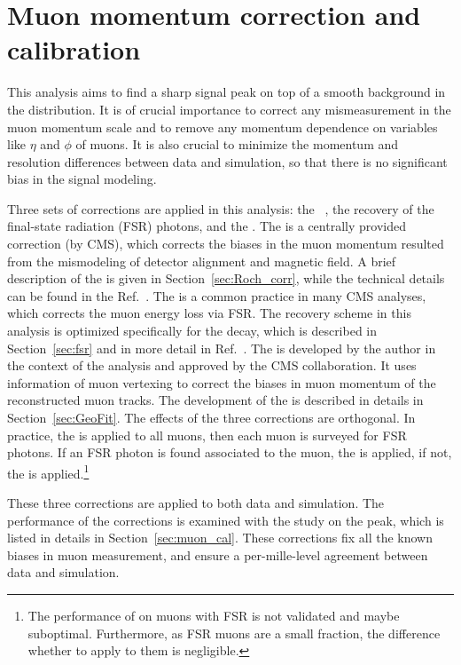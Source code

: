 \chapter{Muon momentum correction and calibration} \label{chp:muon_corr}

This analysis aims to find a sharp signal peak on top of a smooth background in the \mmm distribution.
It is of crucial importance to correct any mismeasurement in the muon momentum scale 
and to remove any momentum dependence on variables like $\eta$ and $\phi$ of muons.
It is also crucial to minimize the momentum and resolution differences between data and simulation, 
so that there is no significant bias in the signal modeling.

Three sets of corrections are applied in this analysis: 
the \RochCorr~\cite{Bodek:2012id}, the recovery of the final-state radiation (FSR) photons, and the \GeoFit.
The \RochCorr is a centrally provided correction (by CMS), which corrects 
the biases in the muon momentum resulted from the mismodeling of detector alignment and magnetic field. 
A brief description of the \RochCorr is given in Section~\ref{sec:Roch_corr}, 
while the technical details can be found in the Ref.~\cite{Bodek:2012id}.
The \FSR is a common practice in many CMS analyses, which corrects the muon energy loss via FSR.
The recovery scheme in this analysis is optimized specifically for the \hmm decay, which is described in Section~\ref{sec:fsr} and in more detail in Ref.~\cite{oliverthesis}.
The \GeoFit is developed by the author in the context of the \hmm analysis and approved by the CMS collaboration.
It uses information of muon vertexing to correct the biases in muon momentum of the reconstructed muon tracks.
The development of the \GeoFit is described in details in Section~\ref{sec:GeoFit}.
The effects of the three corrections are orthogonal.
In practice, the \RochCorr is applied to all muons, then each muon is surveyed for FSR photons.
If an FSR photon is found associated to the muon, the \FSR is applied, 
if not, the \GeoFit is applied.\footnote{The performance of \GeoFit on muons with FSR is not validated and maybe suboptimal. 
Furthermore, as FSR muons are a small fraction, the difference whether to apply \GeoFit to them is negligible.}

These three corrections are applied to both data and simulation.
The performance of the corrections is examined with the study on the \zmm peak,
which is listed in details in Section~\ref{sec:muon_cal}.
These corrections fix all the known biases in muon measurement, 
and ensure a per-mille-level agreement between data and simulation. 

